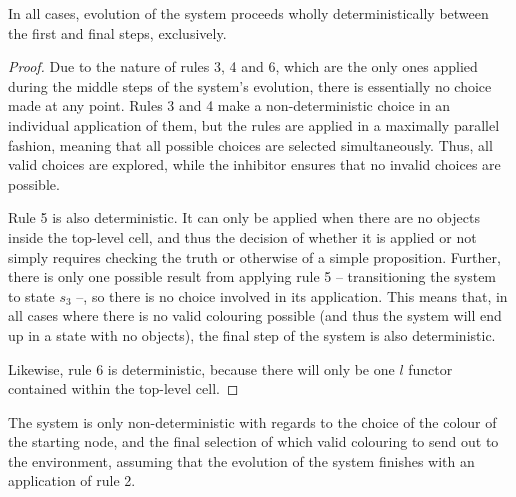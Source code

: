 \begin{proposition}\label{prop:gcol:determin}
In all cases, evolution of the system proceeds wholly deterministically between the first and final steps, exclusively.
\end{proposition}

\begin{proof}
Due to the nature of rules 3, 4 and 6, which are the only ones applied during the middle steps of the system's evolution, there is essentially no choice made at any point.  Rules 3 and 4 make a non-deterministic choice in an individual application of them, but the rules are applied in a maximally parallel fashion, meaning that all possible choices are selected simultaneously.  Thus, all valid choices are explored, while the inhibitor ensures that no invalid choices are possible.

Rule 5 is also deterministic.  It can only be applied when there are no \bo{} objects inside the top-level cell, and thus the decision of whether it is applied or not simply requires checking the truth or otherwise of a simple proposition.  Further, there is only one possible result from applying rule 5 -- transitioning the system to state \(s_3\) --, so there is no choice involved in its application.  This means that, in all cases where there is no valid colouring possible (and thus the system will end up in a state with no \bo{} objects), the final step of the system is also deterministic.

Likewise, rule 6 is deterministic, because there will only be one \(l\) functor contained within the top-level cell.
\end{proof}

\begin{proposition}\label{prop:gcol:nondet}
The system is only non-deterministic with regards to the choice of the colour of the starting node, and the final selection of which valid colouring to send out to the environment, assuming that the evolution of the system finishes with an application of rule 2.
\end{proposition}

